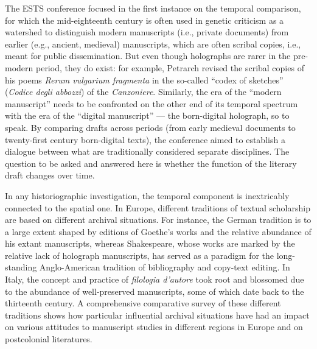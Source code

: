 \begin{preface}
The ESTS conference focused in the first instance on the temporal
comparison, for which the mid-eighteenth century is often used in
genetic criticism as a watershed to distinguish modern manuscripts (i.e., private documents) from earlier (e.g., ancient, medieval) manuscripts,
which are often scribal copies, i.e., meant for public dissemination. But
even though holographs are rarer in the pre-modern period, they do
exist: for example, Petrarch revised the scribal copies of his poems
\emph{Rerum vulgarium fragmenta} in the so-called ``codex of sketches''
(\emph{Codice degli abbozzi}) of the \emph{Canzoniere}. Similarly, the
era of the ``modern manuscript'' needs to be confronted on the other end
of its temporal spectrum with the era of the ``digital manuscript'' –– \label{qtVanhulle3}the
born-digital holograph, so to speak. By comparing drafts across periods
(from early medieval documents to twenty-first century
born-digital texts), the conference aimed to establish a dialogue
between what are traditionally considered separate disciplines. The
question to be asked and answered here is whether the function of the
literary draft changes over time.

In any historiographic investigation, the temporal component is
inextricably connected to the spatial one. In Europe, different
traditions of textual scholarship are based on different archival
situations. For instance, the German tradition is to a large extent
shaped by editions of Goethe's works and the relative abundance of his
extant manuscripts, whereas Shakespeare, whose works are marked by the
relative lack of holograph manuscripts, has served as a paradigm for the
long-standing Anglo-American tradition of bibliography and copy-text
editing. In Italy, the concept and practice of \emph{filologia d'autore}
took root and blossomed due to the abundance of well-preserved
manuscripts, some of which date back to the thirteenth
century. A comprehensive comparative survey of these different
traditions shows how particular influential archival situations have had
an impact on various attitudes to manuscript studies in different
regions in Europe and on postcolonial literatures.


\end{preface}
